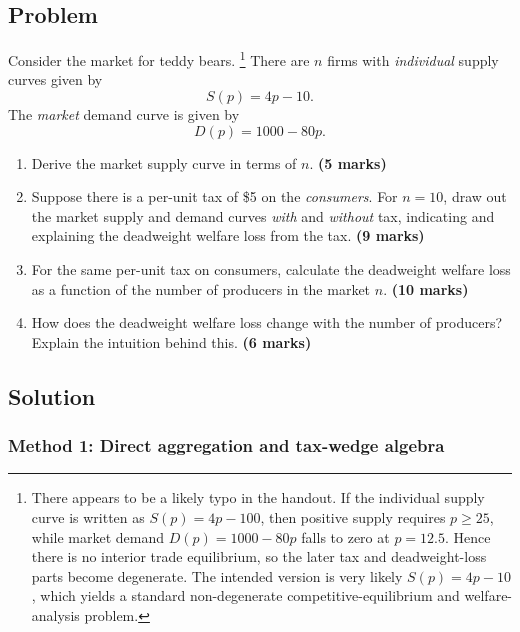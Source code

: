 \documentclass[12pt]{article}
\begin{document}
\subsection{Problem}

\noindent
Consider the market for teddy bears. \footnote{There appears to be a likely typo in the handout. If the individual supply curve is written as \(S(p)=4p-100\), then positive supply requires \(p\ge 25\), while market demand \(D(p)=1000-80p\) falls to zero at \(p=12.5\). Hence there is no interior trade equilibrium, so the later tax and deadweight-loss parts become degenerate. The intended version is very likely \(S(p)=4p-10\), which yields a standard non-degenerate competitive-equilibrium and welfare-analysis problem.} There are \(n\) firms with \emph{individual} supply curves given by
\[
S(p)=4p-10.
\]
The \emph{market} demand curve is given by
\[
D(p)=1000-80p.
\]

\begin{enumerate}[label=(\alph*)]
    \item Derive the market supply curve in terms of \(n\). \hfill \textbf{(5 marks)}
    \item Suppose there is a per-unit tax of \$5 on the \emph{consumers}. For \(n=10\), draw out the market supply and demand curves \emph{with} and \emph{without} tax, indicating and explaining the deadweight welfare loss from the tax. \hfill \textbf{(9 marks)}
    \item For the same per-unit tax on consumers, calculate the deadweight welfare loss as a function of the number of producers in the market \(n\). \hfill \textbf{(10 marks)}
    \item How does the deadweight welfare loss change with the number of producers? Explain the intuition behind this. \hfill \textbf{(6 marks)}
\end{enumerate}

\newpage
\subsection{Solution}

\subsubsection{Method 1: Direct aggregation and tax-wedge algebra}
\end{document}
